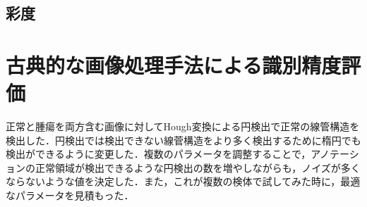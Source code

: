 \subsection*{彩度}
\begin{figure}
	\centering
\end{figure}

\section{古典的な画像処理手法による識別精度評価}
正常と腫瘍を両方含む画像に対してHough変換による円検出で正常の線管構造を検出した．円検出では検出できない線菅構造をより多く検出するために楕円でも検出ができるように変更した．複数のパラメータを調整することで，アノテーションの正常領域が検出できるような円検出の数を増やしながらも，ノイズが多くならないような値を決定した．また，これが複数の検体で試してみた時に，最適なパラメータを見積もった．

